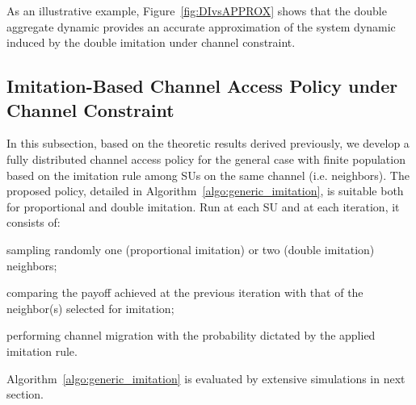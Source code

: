 \documentclass[12pt, onecolumn]{IEEEtran}
\theoremstyle{plain}
\theoremstyle{definition}
\begin{document}
As an illustrative example, Figure~\ref{fig:DIvsAPPROX} shows that the double aggregate dynamic provides an accurate approximation of the system dynamic induced by the
double imitation under channel constraint.






































\subsection{Imitation-Based Channel Access Policy under Channel Constraint}
\label{subsec:algorithm}

In this subsection, based on the theoretic results derived previously, we develop a fully distributed channel access policy for the general case with finite population based on the imitation rule among SUs on the same channel (i.e. neighbors). The proposed policy, detailed in Algorithm~\ref{algo:generic_imitation}, is suitable both for proportional and double imitation. Run at each SU  and at each iteration, it consists of:
\begin{compactitem}
\item sampling randomly one (proportional imitation) or two (double imitation) neighbors;
\item comparing the payoff achieved at the previous iteration  with that of the neighbor(s) selected for imitation;
\item performing channel migration with the probability dictated by the applied imitation rule.
\end{compactitem}
Algorithm~\ref{algo:generic_imitation} is evaluated by extensive simulations in next section.
\end{document}
